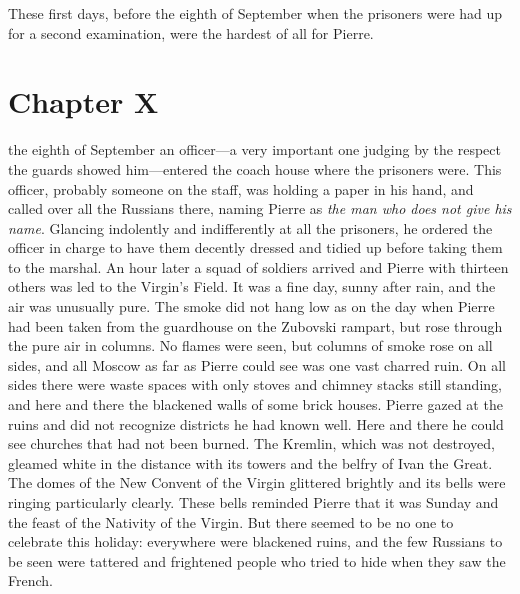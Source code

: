 These first days, before the eighth of September when the
prisoners were had up for a second examination, were the hardest
of all for Pierre.


\chapter*{Chapter X} \ifaudio {}
\fi

 the eighth of September an officer---a very important one
judging by the respect the guards showed him---entered the coach
house where the prisoners were. This officer, probably someone on
the staff, was holding a paper in his hand, and called over all
the Russians there, naming Pierre as \emph{the man who does not
give his name}. Glancing indolently and indifferently at all the
prisoners, he ordered the officer in charge to have them decently
dressed and tidied up before taking them to the marshal. An hour
later a squad of soldiers arrived and Pierre with thirteen others
was led to the Virgin's Field. It was a fine day, sunny after
rain, and the air was unusually pure. The smoke did not hang low
as on the day when Pierre had been taken from the guardhouse on
the Zubovski rampart, but rose through the pure air in
columns. No flames were seen, but columns of smoke rose on all
sides, and all Moscow as far as Pierre could see was one vast
charred ruin. On all sides there were waste spaces with only
stoves and chimney stacks still standing, and here and there the
blackened walls of some brick houses. Pierre gazed at the ruins
and did not recognize districts he had known well. Here and there
he could see churches that had not been burned. The Kremlin,
which was not destroyed, gleamed white in the distance with its
towers and the belfry of Ivan the Great. The domes of the New
Convent of the Virgin glittered brightly and its bells were
ringing particularly clearly.  These bells reminded Pierre that
it was Sunday and the feast of the Nativity of the Virgin. But
there seemed to be no one to celebrate this holiday: everywhere
were blackened ruins, and the few Russians to be seen were
tattered and frightened people who tried to hide when they saw
the French.

